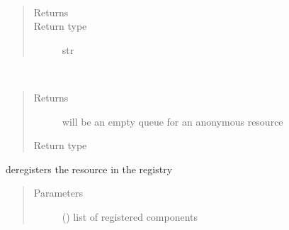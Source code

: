 \documentclass[letterpaper,10pt,english]{sphinxmanual}
\begin{document}
\begin{fulllineitems}
\begin{quote}
\begin{description}
\begin{itemize}
\end{itemize}

\end{description}\end{quote}

\begin{fulllineitems}
\label{\detokenize{Reference:salabim.Resource.base_name}}~\begin{quote}\begin{description}
\item[{Returns}] \leavevmode
{}

\item[{Return type}] \leavevmode
str

\end{description}\end{quote}

\end{fulllineitems}


\begin{fulllineitems}
\label{\detokenize{Reference:salabim.Resource.claimers}}~\begin{quote}\begin{description}
\item[{Returns}] \leavevmode
{} \textendash{} will be an empty queue for an anonymous resource

\item[{Return type}] \leavevmode
{\hyperref[\detokenize{Reference:salabim.Queue}]{}}

\end{description}\end{quote}

\end{fulllineitems}


\begin{fulllineitems}
\label{\detokenize{Reference:salabim.Resource.deregister}}
deregisters the resource in the registry
\begin{quote}\begin{description}
\item[{Parameters}] \leavevmode
{} () \textendash{} list of registered components


\end{description}
\end{quote}
\end{fulllineitems}
\end{fulllineitems}
\end{document}
